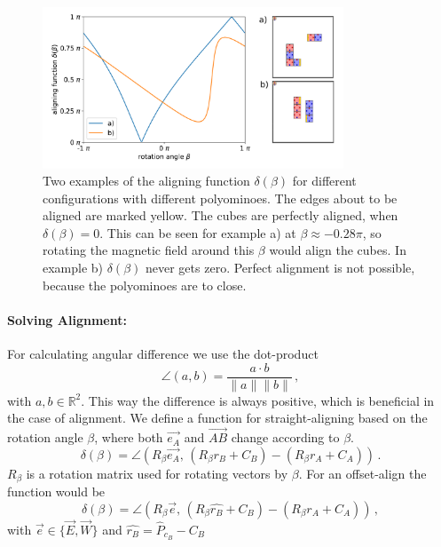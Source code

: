 \begin{figure}
	\centering
	\includegraphics[width=0.8\textwidth]{figures/plots/aligning_function.pdf}
	\caption[Examples of aligning functions $\delta(\beta)$]{Two examples of the aligning function $\delta(\beta)$ for different configurations with different polyominoes.
		The edges about to be aligned are marked yellow.
		The cubes are perfectly aligned, when $\delta(\beta) = 0$.
		This can be seen for example a) at $\beta \approx -0.28\pi$, so rotating the magnetic field around this $\beta$ would align the cubes.
		In example b) $\delta(\beta)$ never gets zero.
		Perfect alignment is not possible, because the polyominoes are to close.}
	\label{fig:aligning_plot}
\end{figure}

\paragraph{Solving Alignment:}

For calculating angular difference we use the dot-product
\begin{equation*}
\angle (a,b) = \frac{a \cdot b}{\lVert a \rVert \lVert b \rVert} \,,
\end{equation*}
with $a,b \in \mathbb{R}^2$. This way the difference is always positive, which is beneficial in the case of alignment.
We define a function for straight-aligning based on the rotation angle $\beta$, where both $\vec{e_A}$ and $\overrightarrow{AB}$ change according to $\beta$.
\begin{equation}
\delta(\beta) = \angle \left( R_\beta \vec{e_A}, \, \left( R_\beta r_B + C_B \right) - \left( R_\beta r_A + C_A \right)\right) \,.
\end{equation}
$R_\beta$ is a rotation matrix used for rotating vectors by $\beta$.
For an offset-align the function would be
\begin{equation}
\delta(\beta) = \angle \left( R_\beta \vec{e}, \, \left( R_\beta \hat{r_B} + C_B \right) - \left( R_\beta r_A + C_A \right)\right) \,,
\end{equation}
with $\vec{e} \in \{ \vec{E}, \vec{W}\}$ and $\hat{r_B} = \hat{P}_{c_B} - C_B$

